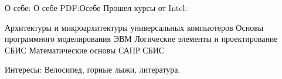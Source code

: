 \documentclass[a4paper, MMyyyy,nonstopmode]{simpleresumecv_ru}
\begin{document}
\begin{Body}

\Section
{О себе:}
{О себе}
{PDF:Осебе}
\BulletItem
Прошел курсы от Intel:
\begin{Detail}
\SubBulletItem
Архитектуры и микроархитектуры универсальных компьютеров
\SubBulletItem
Основы программного моделирования ЭВМ
\SubBulletItem
Логические элементы и проектирование СБИС
\SubBulletItem
Математические основы САПР СБИС
\end{Detail}
\Gap
\BulletItem
Интересы:
Велосипед, 
горные лыжи,
литература.






\end{Body}
\end{document}
